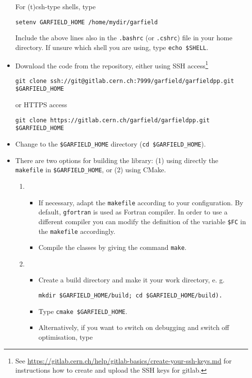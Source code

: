 \begin{itemize}
  For (t)csh-type shells, type
  \begin{lstlisting}
setenv GARFIELD_HOME /home/mydir/garfield
  \end{lstlisting}
  Include the above lines also in the \texttt{.bashrc} 
  (or \texttt{.cshrc}) file in your home directory. 
  If unsure which shell you are using, 
  type \texttt{echo \${SHELL}}.
  \item
  Download the code from the repository, either 
  using SSH access\footnote{See \url{https://gitlab.cern.ch/help/gitlab-basics/create-your-ssh-keys.md}
for instructions how to create and upload the SSH keys for gitlab.} 
  \begin{lstlisting}
git clone ssh://git@gitlab.cern.ch:7999/garfield/garfieldpp.git $GARFIELD_HOME
  \end{lstlisting}
  or HTTPS access
  \begin{lstlisting}
git clone https://gitlab.cern.ch/garfield/garfieldpp.git $GARFIELD_HOME
  \end{lstlisting}
  \item
  Change to the \texttt{\${GARFIELD\_HOME}} directory 
  (\texttt{cd \$GARFIELD\_HOME}).
  \item
  There are two options for building the library: (1) using directly the 
  \texttt{makefile} in \texttt{\${GARFIELD\_HOME}}, or (2) using CMake.
  \begin{enumerate}
  \item
  \begin{itemize}
  \item 
  If necessary, adapt the \texttt{makefile} according 
  to your configuration. 
  By default, \texttt{gfortran} is used as Fortran compiler. 
  In order to use a different compiler 
  you can modify the definition of the variable \texttt{\$FC} in the 
  \texttt{makefile} accordingly.
  \item
  Compile the classes by giving the command \texttt{make}.
  \end{itemize}
  \item
  \begin{itemize}
  \item
  Create a build directory and make it your work directory, e. g.
  \begin{lstlisting}
mkdir $GARFIELD_HOME/build; cd $GARFIELD_HOME/build).
  \end{lstlisting}
  \item
  Type \texttt{cmake \$GARFIELD\_HOME}.
  \item
  Alternatively, if you want to switch on debugging and switch off optimisation, type 

\end{itemize}
\end{enumerate}
\end{itemize}
